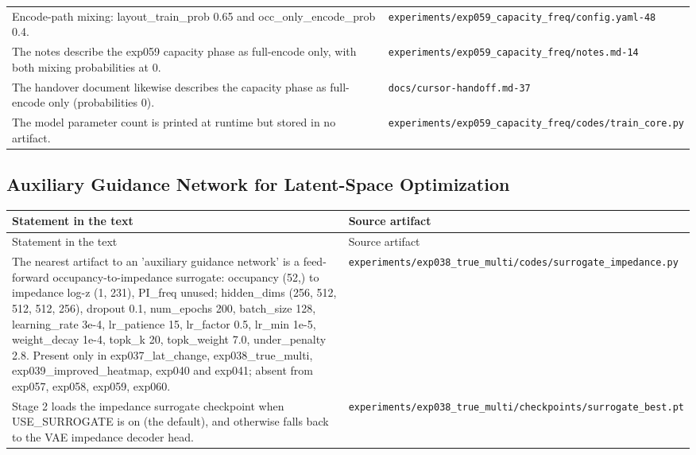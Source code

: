 \begin{longtable}{p{} p{}}
Encode-path mixing: layout\_train\_prob 0.65 and occ\_only\_encode\_prob 0.4. & \texttt{experiments/\allowbreak{}exp059\_\allowbreak{}capacity\_\allowbreak{}freq/\allowbreak{}config.yaml-48} \\
The notes describe the exp059 capacity phase as full-encode only, with both mixing probabilities at 0. & \texttt{experiments/\allowbreak{}exp059\_\allowbreak{}capacity\_\allowbreak{}freq/\allowbreak{}notes.md-14} \\
The handover document likewise describes the capacity phase as full-encode only (probabilities 0). & \texttt{docs/\allowbreak{}cursor-handoff.md-37} \\
The model parameter count is printed at runtime but stored in no artifact. & \texttt{experiments/\allowbreak{}exp059\_\allowbreak{}capacity\_\allowbreak{}freq/\allowbreak{}codes/\allowbreak{}train\_\allowbreak{}core.py} \\
\hline
\end{longtable}
\endgroup

\subsection*{Auxiliary Guidance Network for Latent-Space Optimization}
\begingroup\small
\begin{longtable}{p{} p{}}
\hline
Statement in the text & Source artifact \\
\hline
\endfirsthead
\hline
Statement in the text & Source artifact \\
\hline
\endhead
The nearest artifact to an 'auxiliary guidance network' is a feed-forward occupancy-to-impedance surrogate: occupancy (52,) to impedance log-z (1, 231), PI\_freq unused; hidden\_dims (256, 512, 512, 512, 256), dropout 0.1, num\_epochs 200, batch\_size 128, learning\_rate 3e-4, lr\_patience 15, lr\_factor 0.5, lr\_min 1e-5, weight\_decay 1e-4, topk\_k 20, topk\_weight 7.0, under\_penalty 2.8. Present only in exp037\_lat\_change, exp038\_true\_multi, exp039\_improved\_heatmap, exp040 and exp041; absent from exp057, exp058, exp059, exp060. & \texttt{experiments/\allowbreak{}exp038\_\allowbreak{}true\_\allowbreak{}multi/\allowbreak{}codes/\allowbreak{}surrogate\_\allowbreak{}impedance.py} \\
Stage 2 loads the impedance surrogate checkpoint when USE\_SURROGATE is on (the default), and otherwise falls back to the VAE impedance decoder head. & \texttt{experiments/\allowbreak{}exp038\_\allowbreak{}true\_\allowbreak{}multi/\allowbreak{}checkpoints/\allowbreak{}surrogate\_\allowbreak{}best.pt} \\
\hline
\end{longtable}
\endgroup

